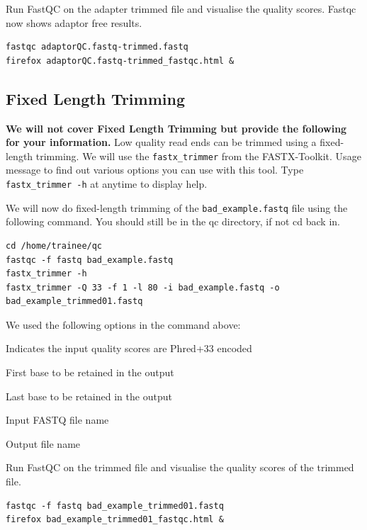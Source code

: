 \begin{advanced}
\begin{steps}
Run FastQC on the adapter trimmed file and visualise the quality scores. Fastqc now shows adaptor free results.

\begin{lstlisting}
fastqc adaptorQC.fastq-trimmed.fastq
firefox adaptorQC.fastq-trimmed_fastqc.html &
\end{lstlisting}
\end{steps}

\subsection{Fixed Length Trimming}
\textbf{We will not cover Fixed Length Trimming but
provide the following for your information.}
Low quality read ends can be trimmed using a fixed-length trimming. We will use the
\texttt{fastx\_trimmer} from the FASTX-Toolkit. Usage message to find out various options
you can use with this tool. Type \texttt{fastx\_trimmer -h} at anytime to display help.

\begin{steps}
We will now do fixed-length trimming of the \texttt{bad\_example.fastq} file
using the following command. You should still be in the qc directory, if not cd back in.
\begin{lstlisting}
cd /home/trainee/qc
fastqc -f fastq bad_example.fastq 
fastx_trimmer -h
fastx_trimmer -Q 33 -f 1 -l 80 -i bad_example.fastq -o bad_example_trimmed01.fastq
\end{lstlisting}
\end{steps}

\begin{note}
We used the following options in the command above:
\begin{description}[style=multiline,labelindent=0cm,align=right,leftmargin=\descriptionlabelspace,rightmargin=1.5cm,font=\ttfamily]
 \item[-Q 33] Indicates the input quality scores are Phred+33 encoded
 \item[-f] First base to be retained in the output
 \item[-l] Last base to be retained in the output
 \item[-i] Input FASTQ file name
 \item[-o] Output file name
\end{description}
\end{note}

\begin{steps}
Run FastQC on the trimmed file and visualise the quality scores of the trimmed file.
\begin{lstlisting}
fastqc -f fastq bad_example_trimmed01.fastq
firefox bad_example_trimmed01_fastqc.html &
\end{lstlisting}


\end{steps}
\end{advanced}
